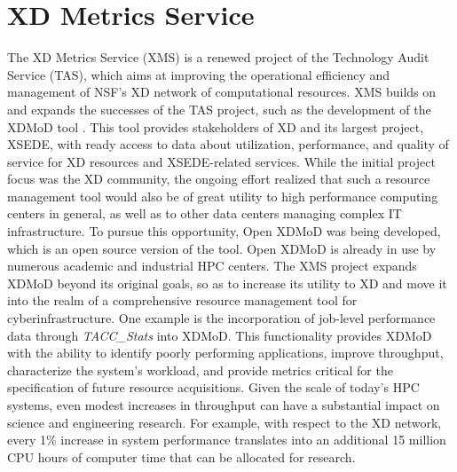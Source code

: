 \section{XD Metrics Service}

The XD Metrics Service (XMS) \cite{hid-sample-vonLaszewski15tas} is a
renewed project of the Technology Audit Service (TAS), which aims at
improving the operational efficiency and management of NSF's XD
network of computational resources. XMS builds on and expands the
successes of the TAS project, such as the development of the XDMoD
tool . This tool provides stakeholders of XD and its
largest project, XSEDE, with ready access to data about utilization,
performance, and quality of service for XD resources and XSEDE-related
services. While the initial project focus was the XD community, the
ongoing effort realized that such a resource management tool would
also be of great utility to high performance computing centers in
general, as well as to other data centers managing complex IT
infrastructure. To pursue this opportunity, Open XDMoD was being
developed, which is an open source version of the tool. Open XDMoD is
already in use by numerous academic and industrial HPC centers. The
XMS project expands XDMoD beyond its original goals, so as to increase
its utility to XD and move it into the realm of a comprehensive
resource management tool for cyberinfrastructure. One example is the
incorporation of job-level performance data through
\textit{TACC\_Stats} into XDMoD. This functionality
provides XDMoD with the ability to identify poorly performing
applications, improve throughput, characterize the system's workload,
and provide metrics critical for the specification of future resource
acquisitions. Given the scale of today's HPC systems, even modest
increases in throughput can have a substantial impact on science and
engineering research. For example, with respect to the XD network,
every 1\% increase in system performance translates into an additional
15 million CPU hours of computer time that can be allocated for
research.





